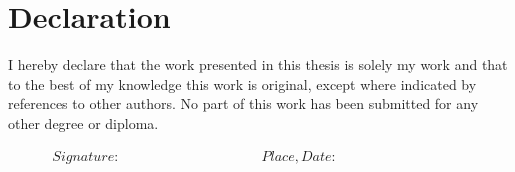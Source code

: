 \documentclass[10pt]{article}
\begin{document}
	\pagebreak
	\section*{Declaration}
		\thispagestyle{empty}
		
		\noindent I hereby declare that the work presented in this thesis is solely my work and that to the best of my
		knowledge this work is original, except where indicated by references to other authors. No part of this
		work has been submitted for any other degree or diploma. 
		
		\begin{displaymath}
		\begin{array}{ll}
		Signature:~~~~~~~~~~~~~~~~~~~~~~~~~~~~~~~~~~~~~~~~~~
		& Place, Date:~~~~~~~~~~~~~~~~~~~~~~~~~~~~~~~~~~~~~~~~~~
		\end{array}
		\end{displaymath}
\end{document}
